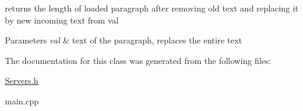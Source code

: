 returns the length of loaded paragraph after removing old text and replacing it by new incoming text from val 
\begin{DoxyParams}{Parameters}
{\em val} & text of the paragraph, replaces the entire text \\
\hline
\end{DoxyParams}


The documentation for this class was generated from the following files\+:\begin{DoxyCompactItemize}
\item 
\hyperlink{_servers_8h}{Servers.\+h}\item 
main.\+cpp\end{DoxyCompactItemize}
